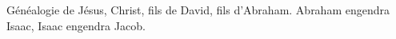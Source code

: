 Généalogie de Jésus, Christ, fils de David, fils d’Abraham.
Abraham engendra Isaac, Isaac engendra Jacob.
